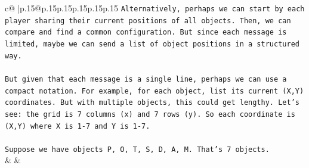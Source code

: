 \documentclass{article}
\begin{document}
{\begin{supertabular}{c@{$\;$}|p{.15\linewidth}@{}p{.15\linewidth}p{.15\linewidth}p{.15\linewidth}p{.15\linewidth}p{.15\linewidth}}
{{{\texttt{Alternatively, perhaps we can start by each player sharing their current positions of all objects. Then, we can compare and find a common configuration. But since each message is limited, maybe we can send a list of object positions in a structured way.} \\
\\ 
\texttt{But given that each message is a single line, perhaps we can use a compact notation. For example, for each object, list its current (X,Y) coordinates. But with multiple objects, this could get lengthy. Let's see: the grid is 7 columns (x) and 7 rows (y). So each coordinate is (X,Y) where X is 1{-}7 and Y is 1{-}7.} \\
\\ 
\texttt{Suppose we have objects P, O, T, S, D, A, M. That's 7 objects.} \\
            }
        }
    }
    & & \\ \\


\end{supertabular}}
\end{document}
